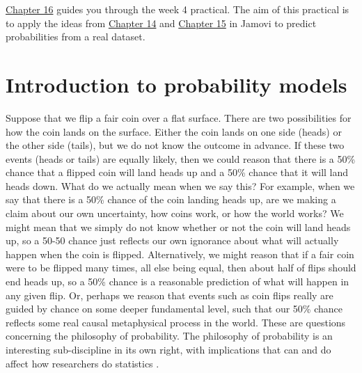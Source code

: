 \documentclass[
]{scrbook}
\begin{document}
\protect\hyperlink{Chapter_16}{Chapter 16} guides you through the week 4 practical.
The aim of this practical is to apply the ideas from \protect\hyperlink{Chapter_14}{Chapter 14} and \protect\hyperlink{Chapter_15}{Chapter 15} in Jamovi to predict probabilities from a real dataset.

\hypertarget{Chapter_14}{%
\chapter{Introduction to probability models}\label{Chapter_14}}

Suppose that we flip a fair coin over a flat surface.
There are two possibilities for how the coin lands on the surface.
Either the coin lands on one side (heads) or the other side (tails), but we do not know the outcome in advance.
If these two events (heads or tails) are equally likely, then we could reason that there is a 50\% chance that a flipped coin will land heads up and a 50\% chance that it will land heads down.
What do we actually mean when we say this?
For example, when we say that there is a 50\% chance of the coin landing heads up, are we making a claim about our own uncertainty, how coins work, or how the world works?
We might mean that we simply do not know whether or not the coin will land heads up, so a 50-50 chance just reflects our own ignorance about what will actually happen when the coin is flipped.
Alternatively, we might reason that if a fair coin were to be flipped many times, all else being equal, then about half of flips should end heads up, so a 50\% chance is a reasonable prediction of what will happen in any given flip.
Or, perhaps we reason that events such as coin flips really are guided by chance on some deeper fundamental level, such that our 50\% chance reflects some real causal metaphysical process in the world.
These are questions concerning the philosophy of probability.
The philosophy of probability is an interesting sub-discipline in its own right, with implications that can and do affect how researchers do statistics \citep{Edwards1972, Mayo1996, Gelman2013, Suarez2020, Mayo2021, Navarro2022}.
\end{document}
